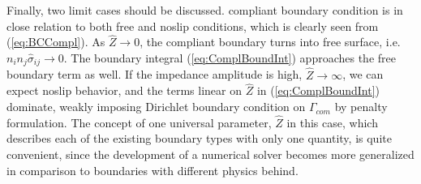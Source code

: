 Finally, two limit cases should be discussed. compliant boundary condition is in close relation to both free and noslip conditions, which is clearly seen from (\ref{eq:BCCompl}). As $\hat{Z} \to 0$, the compliant boundary turns into free surface, i.e. $n_i n_j \hat{\sigma}_{ij} \to 0$. The boundary integral (\ref{eq:ComplBoundInt}) approaches the free boundary term as well. If the impedance amplitude is high, $\hat{Z} \to \infty$, we can expect noslip behavior, and the terms linear on $\hat{Z}$ in (\ref{eq:ComplBoundInt}) dominate, weakly imposing Dirichlet boundary condition on $\Gamma_{com}$ by penalty formulation. The concept of one universal parameter, $\hat{Z}$ in this case, which describes each of the existing boundary types with only one quantity, is quite convenient, since the development of a numerical solver becomes more generalized in comparison to boundaries with different physics behind.
